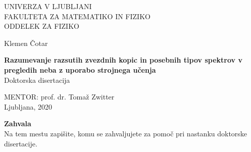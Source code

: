 
\cleardoublepage
\begin{center}

{\large UNIVERZA V LJUBLJANI\\
FAKULTETA ZA MATEMATIKO IN FIZIKO\\
ODDELEK ZA FIZIKO\\}

\vspace{4cm}

{\Large Klemen Čotar\\}

\vspace{10mm}

{\bf \Large Razumevanje razsutih zvezdnih kopic in posebnih tipov spektrov v pregledih neba z uporabo strojnega učenja}\\
\vspace{5mm}
{\sc Doktorska disertacija}\\

\vfill

{\large MENTOR: prof. dr. Tomaž Zwitter\\

\vspace{2cm}
Ljubljana, 2020}

\end{center}

\cleardoublepage
\mbox{}
\vfill
\foreignlanguage{slovene}{
{\Large \bf Zahvala}
\vspace{1cm}\\
Na tem mestu zapišite, komu se zahvaljujete za pomoč pri nastanku doktorske disertacije.
}


